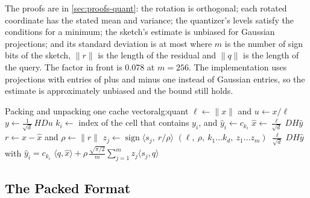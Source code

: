 The proofs are in \cref{sec:proofs-quant}: the rotation is orthogonal; each rotated
coordinate has the stated mean and variance; the quantizer's levels satisfy
the conditions for a minimum; the sketch's estimate is unbiased for Gaussian
projections; and its standard deviation is at most
where $m$ is the number of sign bits of the sketch, $\lVert r \rVert$ is the
length of the residual and $\lVert q \rVert$ is the length of the query. The
factor in front is 0.078 at $m = 256$. The implementation uses projections
with entries of plus and minus one instead of Gaussian entries, so the
estimate is approximately unbiased and the bound still holds.

\begin{pseudocode}{Packing and unpacking one cache vector}{alg:quant}
   
    \State $\ell \gets \lVert x \rVert$ and $u \gets x / \ell$
    \State $y \gets \tfrac{1}{\sqrt d}\, H D u$ 
      \State $k_i \gets$ index of the cell that contains $y_i$, and $\hat y_i \gets c_{k_i}$
    \EndFor
    \State $\hat x \gets \tfrac{\ell}{\sqrt d}\, D H \hat y$ 
    \State $r \gets x - \hat x$ and $\rho \gets \lVert r \rVert$
      \State $z_j \gets \operatorname{sign} \langle s_j,\ r / \rho \rangle$
    \EndFor
    \State \Return $(\ell,\ \rho,\ k_1 \dots k_d,\ z_1 \dots z_m)$ 
  \EndFunction
    \State \Return $\tfrac{\ell}{\sqrt d}\, D H \hat y$ with $\hat y_i = c_{k_i}$
  \EndFunction
   
    \State \Return $\langle q, \hat x \rangle + \rho\, \tfrac{\sqrt{\pi/2}}{m} \sum_{j=1}^{m} z_j \langle s_j, q \rangle$ 
  \EndFunction
\end{pseudocode}

\subsection{The Packed Format}

